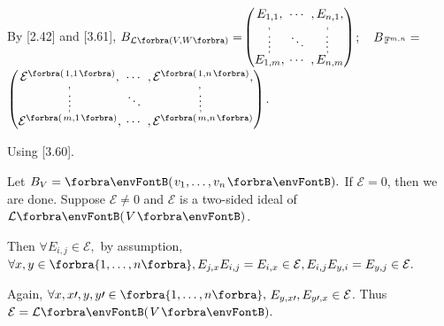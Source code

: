 By [2.42] and [3.61], \;$B_{\Lm[\SmallPar]{V,W}}=${\normalsize${\begin{pmatrix} \underset{\;,}{E_{1,1}}, &\hspace{-6pt} \cdots &\hspace{-6pt} ,\underset{\!,}{E_{n,1}},\\[-2pt] \vdots &\hspace{-6pt} \ddots &\hspace{-6pt} \vdots\\[-2pt] \overset{\;,}{E_{1,m}}, &\hspace{-6pt} \cdots &\hspace{-6pt} ,\overset{\!\!\!,}{E_{n,m}}\end{pmatrix}}$}$;\quad B_{\,{\mathbb{F}}^{m,n}}=${\normalsize$\envFontSmall[\scriptsize]{\begin{pmatrix} \underset{\;,}{\mathcal{E}^{\Par{1,1}}}, &\hspace{-6pt} \cdots &\hspace{-6pt} ,\underset{\!\!,}{\mathcal{E}^{\Par{1,n}}},\\[-2pt] \vdots &\hspace{-6pt} \ddots &\hspace{-6pt} \vdots\\[-2pt]\overset{\;,}{\mathcal{E}^{\Par{m,1}}}, &\hspace{-6pt} \cdots &\hspace{-6pt} ,\overset{\!\!\!,}{\mathcal{E}^{\Par{m,n}}}\end{pmatrix}}$}.\par\vspace{6pt}
\SepLine

 \;Using {\NOTEFOR} [3.60].\par\quad
Let $B_V=\Par{v_1,\dots,v_n}.$ If $\mathcal{E}=0$, then we are done. Suppose $\mathcal{E}\neq 0$ and $\mathcal{E}$ is a two-sided ideal of $\Lm{V}$.\vspace{3pt}\par\quad
Then {\Large\envFontLarge$\forall E_{i,j}\in\mathcal{E},$} by assumption, {\Large\envFontLarge\vspace{3pt}$\forall x,y\in\Bra{1,\dots,n},E_{j,x}E_{i,j}=E_{i,x}\in\mathcal{E},E_{i,j}E_{y,i}=E_{y,j}\in\mathcal{E}.$}\par\quad
Again, $\forall x,x\apostrophe,y,y\apostrophe\in\Bra{1,\dots,n},$\;\,{\Large\envFontLarge$E_{y,x\prime},E_{y\prime,x}\in\mathcal{E}$}. Thus $\mathcal{E}=\Lm{V}.$\PfEnd
\SepLine

